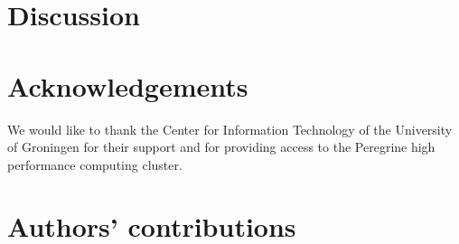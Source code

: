 \documentclass{article}
\begin{document}
\section{Discussion}


\section{Acknowledgements}

We would like to thank the Center for Information Technology of the University of Groningen for their support
and for providing access to the Peregrine high performance computing cluster.

\section{Authors' contributions}



\end{document}
